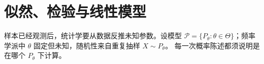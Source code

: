 \chapter{似然、检验与线性模型}
\label{chap:math-inference}

样本已经观测后，统计学要从数据反推未知参数。设模型
\(\mathcal P=\{P_\theta:\theta\in\Theta\}\)；频率学派中
\(\theta\) 固定但未知，随机性来自重复抽样 \(X\sim P_\theta\)。
每一次概率陈述都须说明是在哪个 \(P_\theta\) 下计算。







